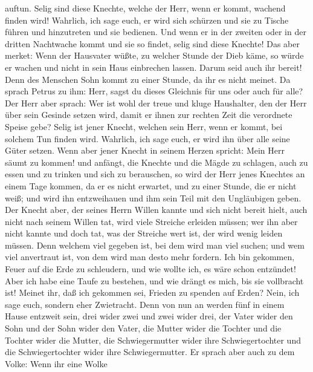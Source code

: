auftun.  Selig sind diese Knechte, welche der Herr, wenn
er kommt, wachend finden wird! Wahrlich, ich sage euch, er wird sich
schürzen und sie zu Tische führen und hinzutreten und sie bedienen.
 Und wenn er in der zweiten oder in der dritten
Nachtwache kommt und sie so findet, selig sind diese Knechte!
 Das aber merket: Wenn der Hausvater wüßte, zu welcher
Stunde der Dieb käme, so würde er wachen und nicht in sein Haus
einbrechen lassen.  Darum seid auch ihr bereit! Denn des
Menschen Sohn kommt zu einer Stunde, da ihr es nicht meinet.
 Da sprach Petrus zu ihm: Herr, sagst du dieses Gleichnis
für uns oder auch für alle?  Der Herr aber sprach: Wer
ist wohl der treue und kluge Haushalter, den der Herr über sein Gesinde
setzen wird, damit er ihnen zur rechten Zeit die verordnete Speise gebe?
 Selig ist jener Knecht, welchen sein Herr, wenn er
kommt, bei solchem Tun finden wird.  Wahrlich, ich sage
euch, er wird ihn über alle seine Güter setzen.  Wenn
aber jener Knecht in seinem Herzen spricht: Mein Herr säumt zu kommen!
und anfängt, die Knechte und die Mägde zu schlagen, auch zu essen und zu
trinken und sich zu berauschen,  so wird der Herr jenes
Knechtes an einem Tage kommen, da er es nicht erwartet, und zu einer
Stunde, die er nicht weiß; und wird ihn entzweihauen und ihm sein Teil
mit den Ungläubigen geben.  Der Knecht aber, der seines
Herrn Willen kannte und sich nicht bereit hielt, auch nicht nach seinem
Willen tat, wird viele Streiche erleiden müssen;  wer ihn
aber nicht kannte und doch tat, was der Streiche wert ist, der wird
wenig leiden müssen. Denn welchem viel gegeben ist, bei dem wird man
viel suchen; und wem viel anvertraut ist, von dem wird man desto mehr
fordern.  Ich bin gekommen, Feuer auf die Erde zu
schleudern, und wie wollte ich, es wäre schon entzündet! 
Aber ich habe eine Taufe zu bestehen, und wie drängt es mich, bis sie
vollbracht ist!  Meinet ihr, daß ich gekommen sei,
Frieden zu spenden auf Erden? Nein, ich sage euch, sondern eher
Zwietracht.  Denn von nun an werden fünf in einem Hause
entzweit sein, drei wider zwei und zwei wider drei,  der
Vater wider den Sohn und der Sohn wider den Vater, die Mutter wider die
Tochter und die Tochter wider die Mutter, die Schwiegermutter wider ihre
Schwiegertochter und die Schwiegertochter wider ihre Schwiegermutter.
 Er sprach aber auch zu dem Volke: Wenn ihr eine Wolke

